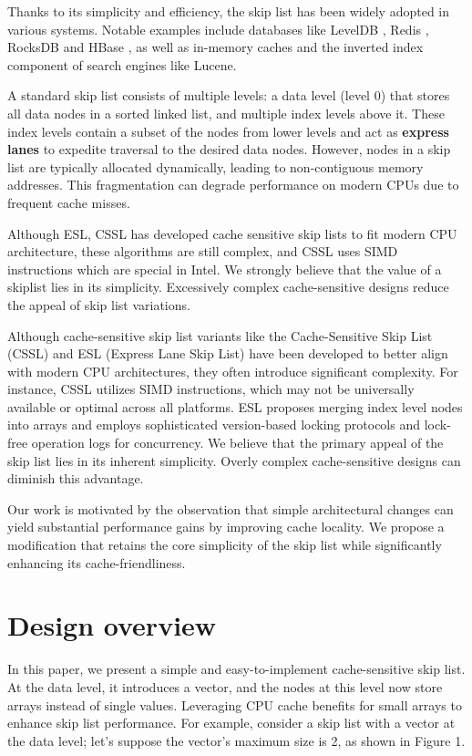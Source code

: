 \documentclass[sigconf, nonacm, letterpaper,top=2cm,bottom=2cm,left=3cm,right=3cm,marginparwidth=1.75cm]{acmart}
\begin{document}
Thanks to its simplicity and efficiency, the skip list has been widely adopted in various systems. Notable examples include databases like LevelDB \cite{ref2}, Redis \cite{ref7}, RocksDB \cite{ref3} and HBase \cite{ref4}, as well as in-memory caches and the inverted index component of search engines like Lucene.

A standard skip list consists of multiple levels: a data level (level 0) that stores all data nodes in a sorted linked list, and multiple index levels above it. These index levels contain a subset of the nodes from lower levels and act as \textbf{express lanes} to expedite traversal to the desired data nodes. However, nodes in a skip list are typically allocated dynamically, leading to non-contiguous memory addresses. This fragmentation can degrade performance on modern CPUs due to frequent cache misses.

Although ESL, CSSL has developed cache sensitive skip lists to fit modern CPU architecture, these algorithms are still complex, and CSSL uses SIMD instructions which are special in Intel. We strongly believe that the value of a skiplist lies in its simplicity.  Excessively complex cache-sensitive designs reduce the appeal of skip list variations.

Although cache-sensitive skip list variants like the Cache-Sensitive Skip List (CSSL) \cite{ref5} and ESL (Express Lane Skip List) \cite{ref6} have been developed to better align with modern CPU architectures, they often introduce significant complexity. For instance, CSSL utilizes SIMD instructions, which may not be universally available or optimal across all platforms. ESL proposes merging index level nodes into arrays and employs sophisticated version-based locking protocols and lock-free operation logs for concurrency. We believe that the primary appeal of the skip list lies in its inherent simplicity. Overly complex cache-sensitive designs can diminish this advantage.

Our work is motivated by the observation that simple architectural changes can yield substantial performance gains by improving cache locality. We propose a modification that retains the core simplicity of the skip list while significantly enhancing its cache-friendliness.

\section{Design overview}

In this paper, we present a simple and easy-to-implement cache-sensitive skip list. At the data level, it introduces a vector, and the nodes at this level now store arrays instead of single values. Leveraging CPU cache benefits for small arrays to enhance skip list performance. For example, consider a skip list with a vector at the data level; let's suppose the vector's maximum size is 2, as shown in Figure 1. 
\end{document}
